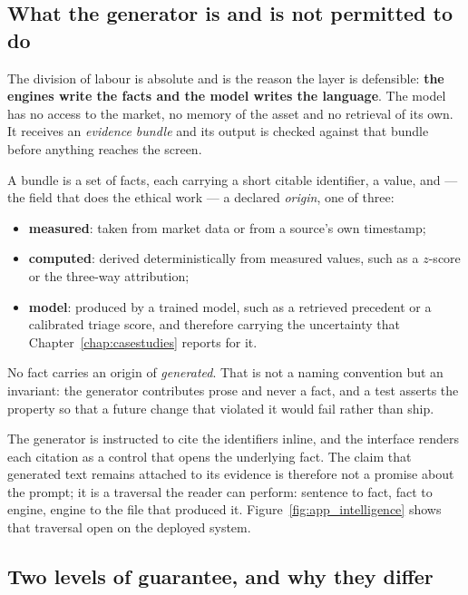 \subsection{What the generator is and is not permitted to do}

The division of labour is absolute and is the reason the layer is defensible: \textbf{the engines
write the facts and the model writes the language}. The model has no access to the market, no
memory of the asset and no retrieval of its own. It receives an \emph{evidence bundle} and its
output is checked against that bundle before anything reaches the screen.

A bundle is a set of facts, each carrying a short citable identifier, a value, and --- the field that
does the ethical work --- a declared \emph{origin}, one of three:

\begin{itemize}
  \item \textbf{measured}: taken from market data or from a source's own timestamp;
  \item \textbf{computed}: derived deterministically from measured values, such as a $z$-score or
        the three-way attribution;
  \item \textbf{model}: produced by a trained model, such as a retrieved precedent or a calibrated
        triage score, and therefore carrying the uncertainty that Chapter~\ref{chap:casestudies}
        reports for it.
\end{itemize}

No fact carries an origin of \emph{generated}. That is not a naming convention but an invariant:
the generator contributes prose and never a fact, and a test asserts the property so that a future
change that violated it would fail rather than ship.

The generator is instructed to cite the identifiers inline, and the interface renders each citation
as a control that opens the underlying fact. The claim that generated text remains attached to its
evidence is therefore not a promise about the prompt; it is a traversal the reader can perform:
sentence to fact, fact to engine, engine to the file that produced it.
Figure~\ref{fig:app_intelligence} shows that traversal open on the deployed system.

\subsection{Two levels of guarantee, and why they differ}

